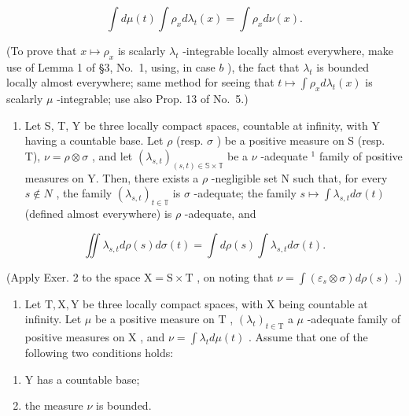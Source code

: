 \[
\int d \mu (t) \int \rho_ {x} d \lambda_ {t} (x) = \int \rho_ {x} d \nu (x).
\]

(To prove that \(x \mapsto \rho_x\) is scalarly \(\lambda_t\) -integrable locally almost everywhere, make use of Lemma 1 of §3, No.~1, using, in case \(b\) ), the fact that \(\lambda_t\) is bounded locally almost everywhere; same method for seeing that \(t \mapsto \int \rho_x d\lambda_t(x)\) is scalarly \(\mu\) -integrable; use also Prop. 13 of No.~5.)

\begin{enumerate}
\def\labelenumi{\arabic{enumi})}
\setcounter{enumi}{2}
\tightlist
\item
  Let S, T, Y be three locally compact spaces, countable at infinity, with Y having a countable base. Let \(\rho\) (resp. \(\sigma\) ) be a positive measure on S (resp. T), \(\nu = \rho \otimes \sigma\) , and let \((\lambda_{s,t})_{(s,t) \in \mathbb{S} \times \mathbb{T}}\) be a \(\nu\) -adequate \(^{1}\) family of positive measures on Y. Then, there exists a \(\rho\) -negligible set N such that, for every \(s \notin N\) , the family \((\lambda_{s,t})_{t \in \mathbb{T}}\) is \(\sigma\) -adequate; the family \(s \mapsto \int \lambda_{s,t} d\sigma(t)\) (defined almost everywhere) is \(\rho\) -adequate, and
\end{enumerate}

\[
\iint \lambda_ {s, t} d \rho (s) d \sigma (t) = \int d \rho (s) \int \lambda_ {s, t} d \sigma (t).
\]

(Apply Exer. 2 to the space \(\mathrm{X} = \mathrm{S} \times \mathrm{T}\) , on noting that \(\nu = \int (\varepsilon_s \otimes \sigma) d\rho(s)\) .)

\begin{enumerate}
\def\labelenumi{\arabic{enumi})}
\setcounter{enumi}{3}
\tightlist
\item
  Let \(\mathrm{T}, \mathrm{X}, \mathrm{Y}\) be three locally compact spaces, with \(\mathrm{X}\) being countable at infinity. Let \(\mu\) be a positive measure on \(\mathrm{T}\) , \((\lambda_t)_{t \in \mathrm{T}}\) a \(\mu\) -adequate family of positive measures on \(\mathrm{X}\) , and \(\nu = \int \lambda_t d\mu(t)\) . Assume that one of the following two conditions holds:
\end{enumerate}

\begin{enumerate}
\def\labelenumi{\alph{enumi})}
\item
  Y has a countable base;
\item
  the measure \(\nu\) is bounded.
\end{enumerate}

